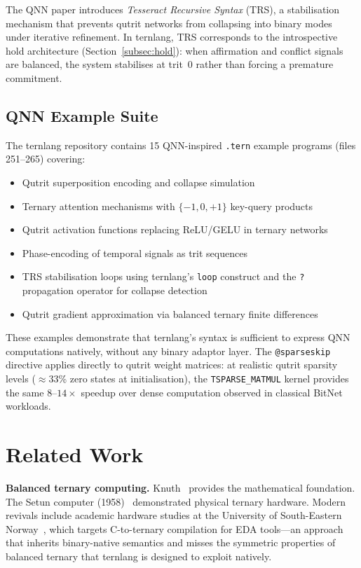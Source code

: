 \documentclass[journal,10pt,twocolumn]{IEEEtran}
\begin{document}
The QNN paper introduces \emph{Tesseract Recursive Syntax} (TRS), a
stabilisation mechanism that prevents qutrit networks from collapsing
into binary modes under iterative refinement. In ternlang, TRS corresponds
to the introspective hold architecture (Section~\ref{subsec:hold}): when
affirmation and conflict signals are balanced, the system stabilises at
trit~$0$ rather than forcing a premature commitment.

\subsection{QNN Example Suite}

The ternlang repository contains 15 QNN-inspired \texttt{.tern} example
programs (files 251–265) covering:

\begin{itemize}
  \item Qutrit superposition encoding and collapse simulation
  \item Ternary attention mechanisms with $\{-1, 0, +1\}$ key-query products
  \item Qutrit activation functions replacing ReLU/GELU in ternary networks
  \item Phase-encoding of temporal signals as trit sequences
  \item TRS stabilisation loops using ternlang's \texttt{loop} construct
        and the \texttt{?} propagation operator for collapse detection
  \item Qutrit gradient approximation via balanced ternary finite differences
\end{itemize}

These examples demonstrate that ternlang's syntax is sufficient to express
QNN computations natively, without any binary adaptor layer. The \texttt{@sparseskip}
directive applies directly to qutrit weight matrices: at realistic qutrit
sparsity levels ($\approx 33$\% zero states at initialisation), the
\texttt{TSPARSE\_MATMUL} kernel provides the same $8$--$14\times$ speedup
over dense computation observed in classical BitNet workloads.

\section{Related Work}
\label{sec:related}

\textbf{Balanced ternary computing.} Knuth~\cite{knuth1997art} provides the
mathematical foundation. The Setun computer (1958)~\cite{brousentsov2002setun}
demonstrated physical ternary hardware. Modern revivals include academic
hardware studies at the University of South-Eastern Norway~\cite{bos2020ternary},
which targets C-to-ternary compilation for EDA tools—an approach that inherits
binary-native semantics and misses the symmetric properties of balanced ternary
that ternlang is designed to exploit natively.
\end{document}
